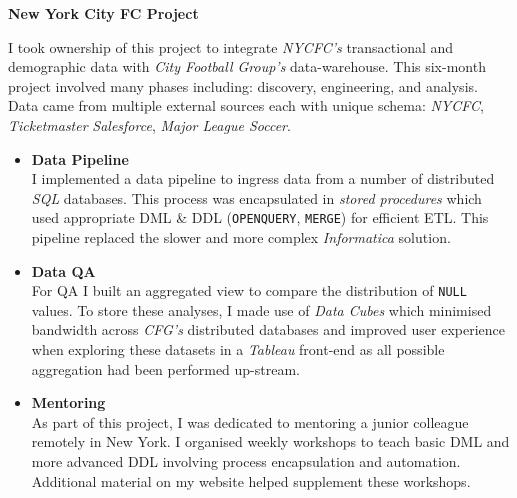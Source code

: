\documentclass[letterpaper,11pt]{article}
\newcommand{\resumeItem}[3]{
	\item\small{
		\textbf{#1}\hfill\tiny{#2\\}\small{ #3 \vspace{-2pt}}
	}
}
\newcommand{\resumeItemListStart}{\begin{itemize}}
\newcommand{\resumeItemListEnd}{\end{itemize}\vspace{-5pt}}
\begin{document}
	\resumeItem{New York City FC Project}{}
	{
		
		
		I took ownership of this project to integrate \textit{NYCFC's} transactional and demographic data with \textit{City Football Group's} data-warehouse. This six-month project involved many phases including: discovery, engineering, and analysis. Data came from multiple external sources each with unique schema: \textit{NYCFC}, \textit{Ticketmaster} \textit{Salesforce}, \textit{Major League Soccer}.		
	\resumeItemListStart
		
		\resumeItem{Data Pipeline}{}
		{
			I implemented a data pipeline to ingress data from a number of distributed \textit{SQL} databases.
			This process was encapsulated in \textit{stored procedures} which used appropriate DML \& DDL (\texttt{OPENQUERY}, \texttt{MERGE}) for efficient ETL.
			\newline
			This pipeline replaced the slower and more complex \textit{Informatica} solution.
			\newline
		}	
		\resumeItem{Data QA}{}
		{
			For QA I built an aggregated view to compare the distribution of \texttt{NULL} values. To store these analyses, I made use of \textit{Data Cubes} which minimised bandwidth across \textit{CFG's} distributed databases and improved user experience when exploring these datasets in a \textit{Tableau} front-end as all possible  aggregation had been performed up-stream.
			\newline
		}
		\resumeItem{Mentoring}{}
		{
			As part of this project, I was dedicated to mentoring a junior colleague remotely in New York. I organised weekly workshops to teach basic DML and more advanced DDL involving process encapsulation and automation. Additional material on my website helped supplement these workshops.
			\newline
		}
	
	\resumeItemListEnd		
	}
\end{document}
